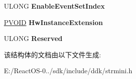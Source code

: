 \begin{DoxyCompactItemize}
\begin{tabbing}
\end{tabbing}\item 
\mbox{\label{struct___h_w___e_v_e_n_t___d_e_s_c_r_i_p_t_o_r_a49f1a381661a51c59b18d1640cafbadf}} 
U\+L\+O\+NG {\bfseries Enable\+Event\+Set\+Index}
\item 
\mbox{\label{struct___h_w___e_v_e_n_t___d_e_s_c_r_i_p_t_o_r_ad9cf694a687b29cd29b86cc011ff78a1}} 
\hyperlink{interfacevoid}{P\+V\+O\+ID} {\bfseries Hw\+Instance\+Extension}
\item 
\mbox{\label{struct___h_w___e_v_e_n_t___d_e_s_c_r_i_p_t_o_r_aac8b80c52c7b754d2b61447d1c4de417}} 
U\+L\+O\+NG {\bfseries Reserved}
\end{DoxyCompactItemize}


该结构体的文档由以下文件生成\+:\begin{DoxyCompactItemize}
\item 
E\+:/\+React\+O\+S-\/0../sdk/include/ddk/strmini.\+h\end{DoxyCompactItemize}
